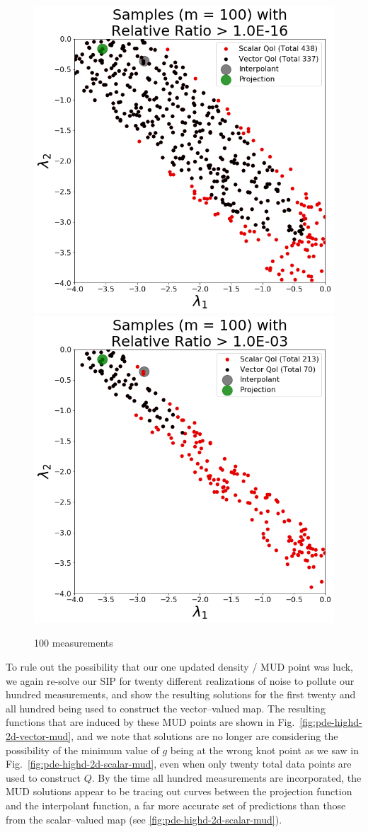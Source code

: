 \begin{figure}[htbp]
\centering
  \includegraphics[width=0.45\linewidth]{figures/pde-highd/pde-highd_update_scatter_D2_t1-0E-16.png}
  \includegraphics[width=0.45\linewidth]{figures/pde-highd/pde-highd_update_scatter_D2_t1-0E-03.png}
\caption{
100 measurements
}
\label{fig:pde-highd-2d-scatter}
\end{figure}

To rule out the possibility that our one updated density / MUD point was luck, we again re-solve our SIP for twenty different realizations of noise to pollute our hundred measurements, and show the resulting solutions for the first twenty and all hundred being used to construct the vector--valued map.
The resulting functions that are induced by these MUD points are shown in Fig.~\ref{fig:pde-highd-2d-vector-mud}, and we note that solutions are no longer are considering the possibility of the minimum value of $g$ being at the wrong knot point as we saw in Fig.~\ref{fig:pde-highd-2d-scalar-mud}, even when only twenty total data points are used to construct $Q$.
By the time all hundred measurements are incorporated, the MUD solutions appear to be tracing out curves between the projection function and the interpolant function, a far more accurate set of predictions than those from the scalar--valued map (see \ref{fig:pde-highd-2d-scalar-mud}).


